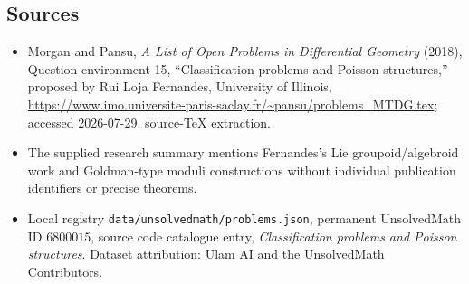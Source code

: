 \documentclass[11pt]{article}
\begin{document}
\subsection{Sources}
\begin{itemize}
\item Morgan and Pansu, \emph{A List of Open Problems in Differential Geometry} (2018), Question environment 15, ``Classification problems and Poisson structures,'' proposed by Rui Loja Fernandes, University of Illinois, \url{https://www.imo.universite-paris-saclay.fr/~pansu/problems_MTDG.tex}; accessed 2026-07-29, source-TeX extraction.
\item The supplied research summary mentions Fernandes's Lie groupoid/algebroid work and Goldman-type moduli constructions without individual publication identifiers or precise theorems.
\item Local registry \texttt{data/unsolvedmath/problems.json}, permanent UnsolvedMath ID $6800015$, source code catalogue entry, \emph{Classification problems and Poisson structures}. Dataset attribution: Ulam AI and the UnsolvedMath Contributors.
\end{itemize}
\end{document}
